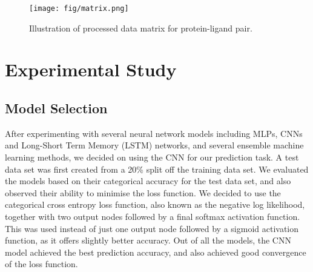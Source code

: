 \documentclass[11pt]{article}
\begin{document}
\begin{figure}[htb]
    \centering
    \texttt{[image: fig/matrix.png]}
    \caption{Illustration of processed data matrix for protein-ligand pair.}
    \label{fig:matrix}
\end{figure}

\section{Experimental Study}
\subsection{Model Selection}
After experimenting with several neural network models including MLPs, CNNs and Long-Short Term Memory (LSTM) \cite{hochreiter1997long} networks, and several ensemble machine learning methods, we decided on using the CNN for our prediction task. A test data set was first created from a 20\% split off the training data set. We evaluated the models based on their categorical accuracy for the test data set, and also observed their ability to minimise the loss function. We decided to use the categorical cross entropy loss function, also known as the negative log likelihood, together with two output nodes followed by a final softmax activation function. This was used instead of just one output node followed by a sigmoid activation function, as it offers slightly better accuracy. Out of all the models, the CNN model achieved the best prediction accuracy, and also achieved good convergence of the loss function.
\end{document}

